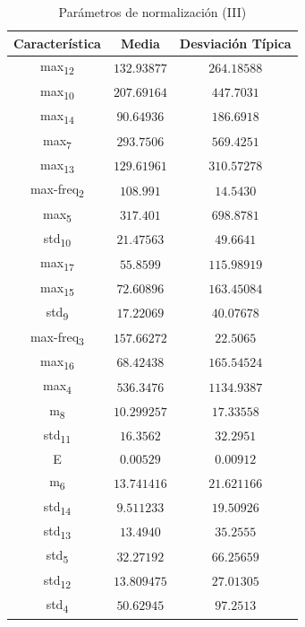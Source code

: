 \documentclass[12pt]{article}
\begin{document}
\begin{table}
	\caption{Parámetros de normalización (III)}
	\centering
		\begin{tabular}{||c c c||}
			\hline
			Característica & Media & Desviación Típica  \\ [0.5ex]
			\hline\hline
			max\textsubscript{12} & $132.93877$ & $264.18588$ \\
			\hline
			max\textsubscript{10} & $207.69164$ & $447.7031$ \\
			\hline
			max\textsubscript{14} & $90.64936$ & $186.6918$ \\
			\hline
			max\textsubscript{7} & $293.7506$ & $569.4251$ \\
			\hline
			max\textsubscript{13} & $129.61961$ & $310.57278$ \\
			\hline
			max-freq\textsubscript{2} & $108.991$ & $14.5430$ \\
			\hline
			max\textsubscript{5} & $317.401$ & $698.8781$ \\
			\hline
			std\textsubscript{10} & $21.47563$ & $49.6641$ \\
			\hline
			max\textsubscript{17} & $55.8599$ & $115.98919$ \\
			\hline
			max\textsubscript{15} & $72.60896$ & $163.45084$ \\
			\hline
			std\textsubscript{9} & $17.22069$ & $40.07678$ \\
			\hline
			max-freq\textsubscript{3} & $157.66272$ & $22.5065$ \\
			\hline
			max\textsubscript{16} & $68.42438$ & $165.54524$ \\
			\hline
			max\textsubscript{4} & $536.3476$ & $1134.9387$ \\
			\hline
			m\textsubscript{8} & $10.299257$ & $17.33558$ \\
			\hline
			std\textsubscript{11} & $16.3562$ & $32.2951$ \\
			\hline
			E & $0.00529$ & $0.00912$ \\
			\hline
			m\textsubscript{6} & $13.741416$ & $21.621166$ \\
			\hline
			std\textsubscript{14} & $9.511233$ & $19.50926$ \\
			\hline
			std\textsubscript{13} & $13.4940$ & $35.2555$ \\
			\hline
			std\textsubscript{5} & $32.27192$ & $66.25659$ \\
			\hline
			std\textsubscript{12} & $13.809475$ & $27.01305$ \\
			\hline
			std\textsubscript{4} & $50.62945$ & $97.2513$ \\

\end{tabular}
\end{table}
\end{document}
